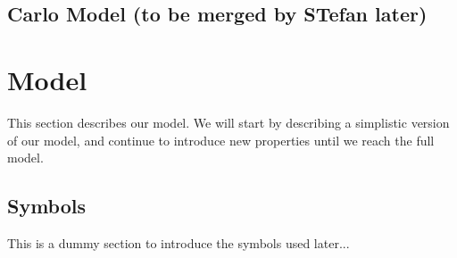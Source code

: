 \documentclass[9pt,twocolumn]{scrartcl}
\begin{document}
\subsection{Carlo Model (to be merged by STefan later)}

\section{Model}

This section describes our model. We will start by describing a simplistic
version of our model, and continue to introduce new properties until we reach
the full model.

\newcommand{\CostPerChunk}{\ensuremath{\textsc{cost}}}
\newcommand{\Distance}{\ensuremath{\textsc{dist}}}

\subsection{Symbols}

This is a dummy section to introduce the symbols used later...
\end{document}
